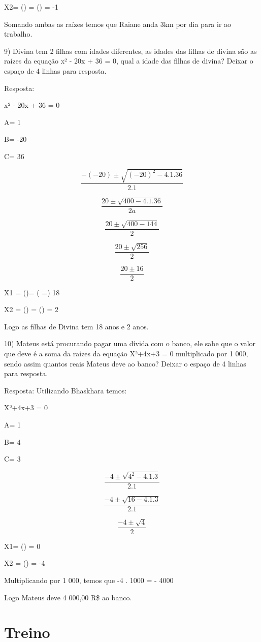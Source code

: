 X2= () = () = -1

Somando ambas as raízes temos que Raiane anda 3km por dia para ir ao
trabalho.

9) Divina tem 2 filhas com idades diferentes, as idades das filhas de
divina são as raízes da equação x² - 20x + 36 = 0, qual a idade das
filhas de divina? Deixar o espaço de 4 linhas para resposta.

Resposta:

x² - 20x + 36 = 0

A= 1

B= -20

C= 36

\[\frac{- ( - 20) \pm \sqrt{{( - 20)}^{2} - 4.1.36}}{2.1}\]

\[\frac{20 \pm \sqrt{400 - 4.1.36}}{2a}\]

\[\frac{20 \pm \sqrt{400 - 144}}{2}\]

\[\frac{20 \pm \sqrt{256}}{2}\]

\[\frac{20 \pm 16}{2}\]

X1 = ()= ( =) 18

X2 = () = () = 2

Logo as filhas de Divina tem 18 anos e 2 anos.

10) Mateus está procurando pagar uma dívida com o banco, ele sabe que o
valor que deve é a soma da raízes da equação X²+4x+3 = 0 multiplicado
por 1 000, sendo assim quantos reais Mateus deve ao banco? Deixar o
espaço de 4 linhas para resposta.

Resposta: Utilizando Bhaskhara temos:

X²+4x+3 = 0

A= 1

B= 4

C= 3

\[\frac{- 4 \pm \sqrt{4^{2} - 4.1.3}}{2.1}\]

\[\frac{- 4 \pm \sqrt{16 - 4.1.3}}{2.1}\]

\[\frac{- 4 \pm \sqrt{4}}{2}\]

X1= () = 0

X2 = () = -4

Multiplicando por 1 000, temos que -4 . 1000 = - 4000

Logo Mateus deve 4 000,00 R\$ ao banco.

\section{Treino}

